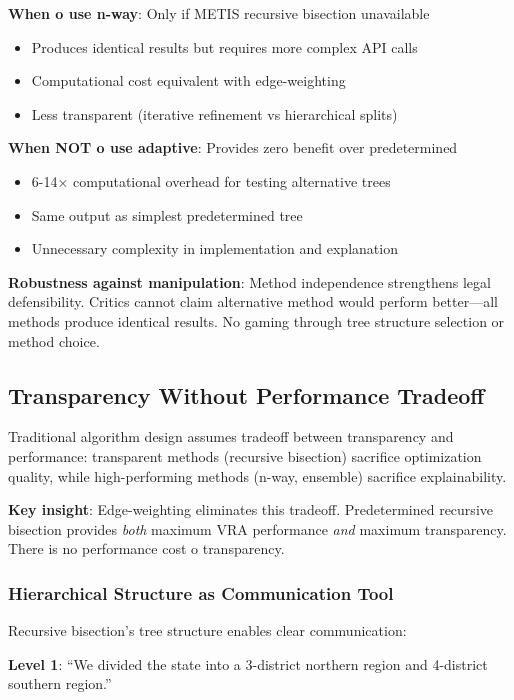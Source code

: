 \textbf{When 	o use n-way}: Only if METIS recursive bisection unavailable
\begin{itemize}
\item Produces identical results but requires more complex API calls
\item Computational cost equivalent with edge-weighting
\item Less transparent (iterative refinement vs hierarchical splits)
\end{itemize}

\textbf{When NOT 	o use adaptive}: Provides zero benefit over predetermined
\begin{itemize}
\item 6-14× computational overhead for testing alternative trees
\item Same output as simplest predetermined tree
\item Unnecessary complexity in implementation and explanation
\end{itemize}

\textbf{Robustness against manipulation}: Method independence strengthens legal defensibility. Critics cannot claim alternative method would perform better—all methods produce identical results. No gaming through tree structure selection or method choice.

\subsection{Transparency Without Performance Tradeoff}

Traditional algorithm design assumes tradeoff between transparency and performance: transparent methods (recursive bisection) sacrifice optimization quality, while high-performing methods (n-way, ensemble) sacrifice explainability.

\textbf{Key insight}: Edge-weighting eliminates this tradeoff. Predetermined recursive bisection provides \textit{both} maximum VRA performance \textit{and} maximum transparency. There is no performance cost 	o transparency.

\subsubsection{Hierarchical Structure as Communication Tool}

Recursive bisection's tree structure enables clear communication:

\textbf{Level 1}: ``We divided the state into a 3-district northern region and 4-district southern region.''

